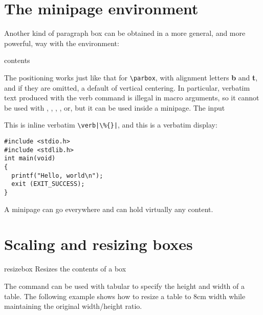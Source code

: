 {\begin{texexample}{}{}
\end{texexample}


\section{The minipage environment}

Another kind of paragraph box can be obtained in a more general, and
more powerful, way with the  environment:

\begin{phdverbatim}
\begin{minipage}[position]{width}
   contents
\end{minipage}   
\end{phdverbatim}


The positioning works just like that for \verb+\parbox+, with alignment letters \textbf{b}
and \textbf{t}, and if they are omitted, a default of vertical centering.
In particular, verbatim text produced with the verb command is illegal
in macro arguments, so it cannot be used with , , ,
, or, but it can be used inside a minipage. The input


\begin{texexample}{}{}
\begin{minipage}{170pt}
This is inline verbatim \verb=\verb|\%{}|=, and this
is a verbatim display:

\begin{verbatim}
#include <stdio.h>
#include <stdlib.h>
int main(void)
{
  printf("Hello, world\n");
  exit (EXIT_SUCCESS);
}
\end{verbatim}
\end{minipage}

\end{texexample}


A minipage can go everywhere and can hold virtually any content.


\section{Scaling and resizing boxes}

\begin{docCommand}{resizebox}{}{}
Resizes the contents of a box
\end{docCommand}

The command  can be used with tabular to specify the height and width of a table. The following example shows how to resize a table to 8cm width while maintaining the original width/height ratio.

}
